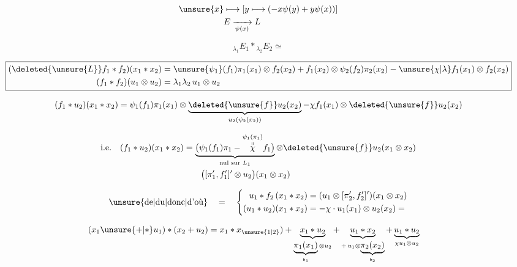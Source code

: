 

\[
\begin{aligned}
\unsure{x}&\longmapsto[y\longmapsto(-x\psi(y)+y\psi(x))]\\
&E\xrightarrow[\psi(x)]{}L
\end{aligned}
\]

\[
{}_{\lambda_1}E_1\ast{}_{\lambda_2}E_2\simeq
\]

\[
\boxed{\begin{aligned}
(\deleted{\unsure{L}}f_1\ast f_2)(x_1\ast x_2)
 &=\unsure{\psi_1}(f_1)\pi_1(x_1)\otimes f_2(x_2)
 + f_1(x_2)\otimes\psi_2(f_2)\pi_2(x_2)
 -\unsure{\chi|\lambda} f_1(x_1)\otimes f_2(x_2)\\
(f_1\ast f_2)(u_1\otimes u_2)&=\lambda_1\lambda_2\,u_1\otimes u_2
\end{aligned}}
\]

\[
(f_1\ast u_2)(x_1\ast x_2)=
\psi_1(f_1)\pi_1(x_1)\otimes\underbrace{\deleted{\unsure{f}}u_2(x_2)}_{u_2(\psi_2(x_2))}
-\chi f_1(x_1)\otimes\deleted{\unsure{f}}u_2(x_2)
\]


\[
\begin{aligned}
\text{i.e.}\quad (f_1\ast u_2)(x_1\ast x_2)
 &=\underbrace{\big(\psi_1(f_1)\pi_1-\overset{\substack{\psi_1(\pi_1)\\ \shortparallel}}{\chi} f_1\big)}_{\text{nul sur } L_1}\otimes\deleted{\unsure{f}}u_2(x_1\otimes x_2)\\
 &\qquad\big([\pi'_1,f'_1]'\otimes u_2\big)(x_1\otimes x_2)
\end{aligned}
\]

\[
\text{\unsure{de|du|donc|d'où}}\quad =\quad\left\{\begin{aligned}
u_1\ast f_2\,(x_1\ast x_2)&=(u_1\otimes[\pi'_2,f'_2]')(x_1\otimes x_2)\\
(u_1\ast u_2)(x_1\ast x_2)&=-\chi\cdot u_1(x_1)\otimes u_2(x_2)=
\end{aligned}\right.
\]


\[
\begin{aligned}
(x_1\unsure{+|\ast}u_1)\ast(x_2+u_2)
&=x_1\ast x_{\unsure{1|2}})+
\underbrace{x_1\ast u_2}_{\underbrace{\pi_1(x_1)}_{b_1}\otimes u_2}
+\underbrace{u_1\ast x_2}_{+\,u_1\otimes\underbrace{\pi_2(x_2)}_{b_2}}
+\underbrace{u_1\ast u_2}_{\chi u_1\otimes u_2}
\end{aligned}
\]

